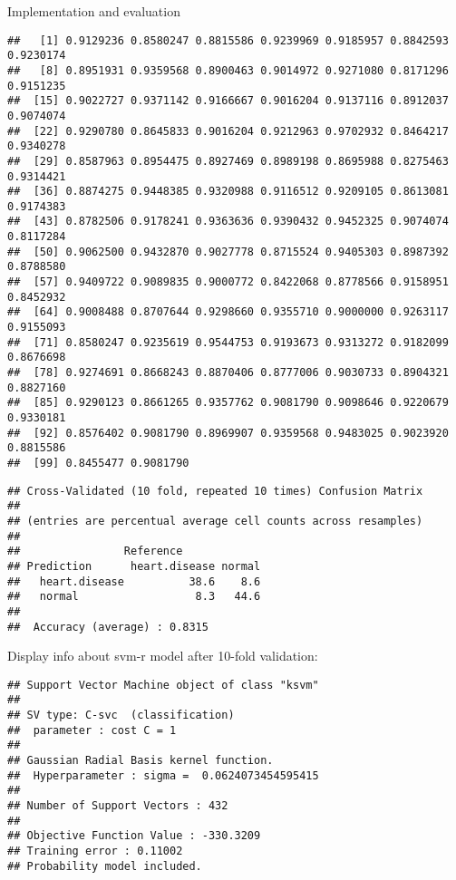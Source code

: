\documentclass[
  ignorenonframetext,
]{beamer}
\begin{document}
\begin{frame}[fragile]{Implementation and evaluation}
\begin{verbatim}
##   [1] 0.9129236 0.8580247 0.8815586 0.9239969 0.9185957 0.8842593 0.9230174
##   [8] 0.8951931 0.9359568 0.8900463 0.9014972 0.9271080 0.8171296 0.9151235
##  [15] 0.9022727 0.9371142 0.9166667 0.9016204 0.9137116 0.8912037 0.9074074
##  [22] 0.9290780 0.8645833 0.9016204 0.9212963 0.9702932 0.8464217 0.9340278
##  [29] 0.8587963 0.8954475 0.8927469 0.8989198 0.8695988 0.8275463 0.9314421
##  [36] 0.8874275 0.9448385 0.9320988 0.9116512 0.9209105 0.8613081 0.9174383
##  [43] 0.8782506 0.9178241 0.9363636 0.9390432 0.9452325 0.9074074 0.8117284
##  [50] 0.9062500 0.9432870 0.9027778 0.8715524 0.9405303 0.8987392 0.8788580
##  [57] 0.9409722 0.9089835 0.9000772 0.8422068 0.8778566 0.9158951 0.8452932
##  [64] 0.9008488 0.8707644 0.9298660 0.9355710 0.9000000 0.9263117 0.9155093
##  [71] 0.8580247 0.9235619 0.9544753 0.9193673 0.9313272 0.9182099 0.8676698
##  [78] 0.9274691 0.8668243 0.8870406 0.8777006 0.9030733 0.8904321 0.8827160
##  [85] 0.9290123 0.8661265 0.9357762 0.9081790 0.9098646 0.9220679 0.9330181
##  [92] 0.8576402 0.9081790 0.8969907 0.9359568 0.9483025 0.9023920 0.8815586
##  [99] 0.8455477 0.9081790
\end{verbatim}

\begin{verbatim}
## Cross-Validated (10 fold, repeated 10 times) Confusion Matrix 
## 
## (entries are percentual average cell counts across resamples)
##  
##                Reference
## Prediction      heart.disease normal
##   heart.disease          38.6    8.6
##   normal                  8.3   44.6
##                             
##  Accuracy (average) : 0.8315
\end{verbatim}

Display info about svm-r model after 10-fold validation:

\begin{verbatim}
## Support Vector Machine object of class "ksvm" 
## 
## SV type: C-svc  (classification) 
##  parameter : cost C = 1 
## 
## Gaussian Radial Basis kernel function. 
##  Hyperparameter : sigma =  0.0624073454595415 
## 
## Number of Support Vectors : 432 
## 
## Objective Function Value : -330.3209 
## Training error : 0.11002 
## Probability model included.
\end{verbatim}


\end{frame}
\end{document}
